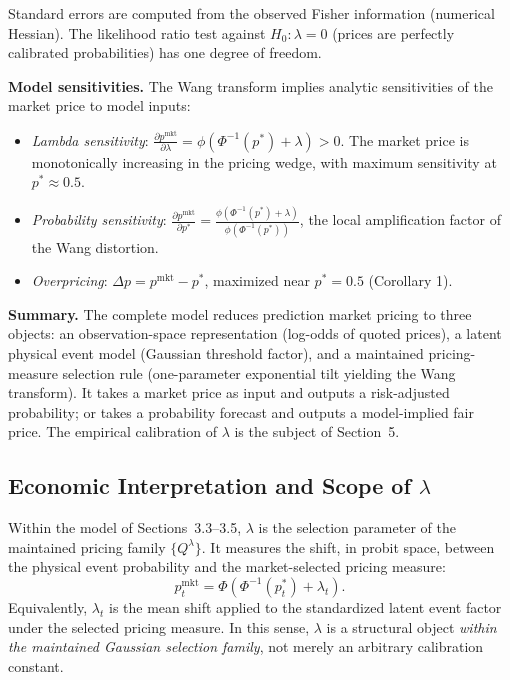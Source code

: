 \documentclass[12pt,a4paper]{article}
\providecommand{\tightlist}{%
  \setlength{\itemsep}{0pt}\setlength{\parskip}{0pt}}
\begin{document}
Standard errors are computed from the observed Fisher information
(numerical Hessian). The likelihood ratio test against
$H_0: \lambda = 0$ (prices are perfectly calibrated probabilities) has
one degree of freedom.

\textbf{Model sensitivities.} The Wang transform implies analytic
sensitivities of the market price to model inputs:

\begin{itemize}
\tightlist
\item
  \textit{Lambda sensitivity}:
  \(\displaystyle\frac{\partial p^{\text{mkt}}}{\partial \lambda} = \phi\!\left(\Phi^{-1}(p^*) + \lambda\right) > 0\).
  The market price is monotonically increasing in the pricing wedge,
  with maximum sensitivity at \(p^* \approx 0.5\).
\item
  \textit{Probability sensitivity}:
  \(\displaystyle\frac{\partial p^{\text{mkt}}}{\partial p^*} = \frac{\phi(\Phi^{-1}(p^*) + \lambda)}{\phi(\Phi^{-1}(p^*))}\),
  the local amplification factor of the Wang distortion.
\item
  \textit{Overpricing}: \(\Delta p = p^{\text{mkt}} - p^*\), maximized
  near \(p^* = 0.5\) (Corollary 1).
\end{itemize}

\textbf{Summary.} The complete model reduces prediction market pricing
to three objects: an observation-space representation (log-odds of quoted prices), a latent physical event model (Gaussian threshold factor), and a maintained pricing-measure selection rule (one-parameter exponential tilt yielding the Wang transform). It takes
a market price as input and outputs a risk-adjusted probability; or
takes a probability forecast and outputs a model-implied fair price. The
empirical calibration of $\lambda$ is the subject of Section~5.

\subsection{Economic Interpretation and Scope of \texorpdfstring{$\lambda$}{lambda}}\label{economic-interpretation-of-lambda}

Within the model of Sections~3.3--3.5, $\lambda$ is the selection parameter of the maintained pricing family $\{Q^\lambda\}$. It measures the shift, in probit space, between the physical event probability and the market-selected pricing measure:
\[
p_t^{\mathrm{mkt}}
=
\Phi\!\left(\Phi^{-1}(p_t^*)+\lambda_t\right).
\]
Equivalently, $\lambda_t$ is the mean shift applied to the standardized latent event factor under the selected pricing measure. In this sense, $\lambda$ is a structural object \emph{within the maintained Gaussian selection family}, not merely an arbitrary calibration constant.
\end{document}
